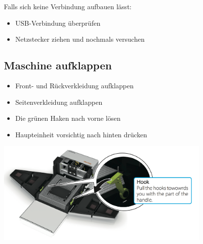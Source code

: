 \documentclass{\basedir/fablab-document}
\begin{document}
Falls sich keine Verbindung aufbauen lässt:
\begin{itemize}
	\item USB-Verbindung überprüfen
	\item Netzstecker ziehen und nochmals versuchen
\end{itemize}

\subsection{Maschine aufklappen}
\label{aufklappen}
\begin{itemize}
	\item Front- und Rückverkleidung aufklappen
	\item Seitenverkleidung aufklappen
	\item Die grünen Haken nach vorne lösen
	\item Haupteinheit vorsichtig nach hinten drücken
\end{itemize}
\begin{center}
	\includegraphics[width=0.8\textwidth]{img/aufklappen}
\end{center}
\end{document}
